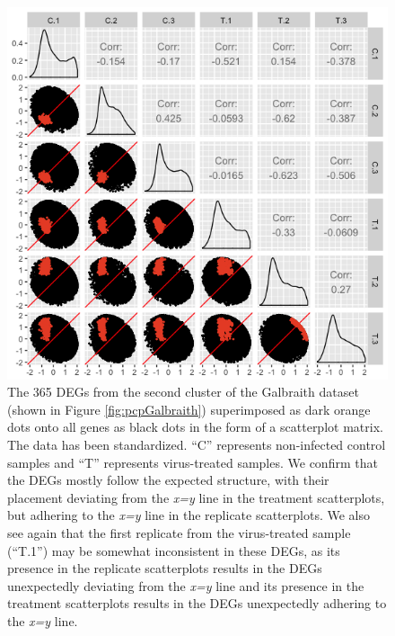 \documentclass[11pt,a4paper,oldfontcommands,openany]{memoir}
\numberwithin{equation}{section} %
\begin{document}
\begin{figure}[H]
  \includegraphics[width=\textwidth]{Images/GalbraithClust2SM}
  \caption{The 365 DEGs from the second cluster of the Galbraith dataset (shown in Figure \ref{fig:pcpGalbraith}) superimposed as dark orange dots onto all genes as black dots in the form of a scatterplot matrix. The data has been standardized. ``C'' represents non-infected control samples and ``T'' represents virus-treated samples. We confirm that the DEGs mostly follow the expected structure, with their placement deviating from the \textit{x=y} line in the treatment scatterplots, but adhering to the \textit{x=y} line in the replicate scatterplots. We also see again that the first replicate from the virus-treated sample (``T.1'') may be somewhat inconsistent in these DEGs, as its presence in the replicate scatterplots results in the DEGs unexpectedly deviating from the \textit{x=y} line and its presence in the treatment scatterplots results in the DEGs unexpectedly adhering to the \textit{x=y} line.}
  \label{fig:GalbraithClust2SM}
\end{figure}
\end{document}
